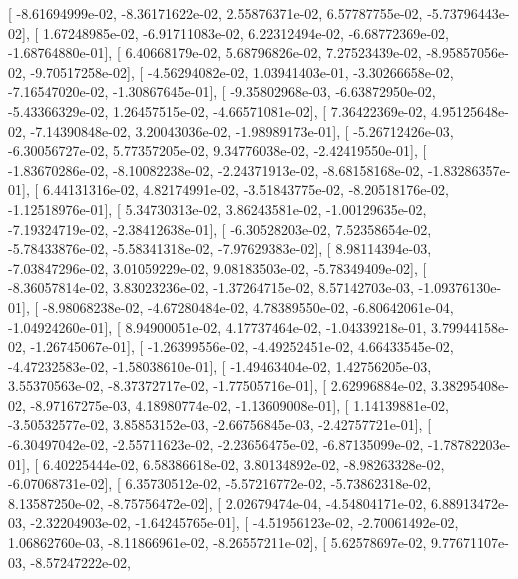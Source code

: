 \documentclass{article}
\begin{document}
       [ -8.61694999e-02,  -8.36171622e-02,   2.55876371e-02,
          6.57787755e-02,  -5.73796443e-02],
       [  1.67248985e-02,  -6.91711083e-02,   6.22312494e-02,
         -6.68772369e-02,  -1.68764880e-01],
       [  6.40668179e-02,   5.68796826e-02,   7.27523439e-02,
         -8.95857056e-02,  -9.70517258e-02],
       [ -4.56294082e-02,   1.03941403e-01,  -3.30266658e-02,
         -7.16547020e-02,  -1.30867645e-01],
       [ -9.35802968e-03,  -6.63872950e-02,  -5.43366329e-02,
          1.26457515e-02,  -4.66571081e-02],
       [  7.36422369e-02,   4.95125648e-02,  -7.14390848e-02,
          3.20043036e-02,  -1.98989173e-01],
       [ -5.26712426e-03,  -6.30056727e-02,   5.77357205e-02,
          9.34776038e-02,  -2.42419550e-01],
       [ -1.83670286e-02,  -8.10082238e-02,  -2.24371913e-02,
         -8.68158168e-02,  -1.83286357e-01],
       [  6.44131316e-02,   4.82174991e-02,  -3.51843775e-02,
         -8.20518176e-02,  -1.12518976e-01],
       [  5.34730313e-02,   3.86243581e-02,  -1.00129635e-02,
         -7.19324719e-02,  -2.38412638e-01],
       [ -6.30528203e-02,   7.52358654e-02,  -5.78433876e-02,
         -5.58341318e-02,  -7.97629383e-02],
       [  8.98114394e-03,  -7.03847296e-02,   3.01059229e-02,
          9.08183503e-02,  -5.78349409e-02],
       [ -8.36057814e-02,   3.83023236e-02,  -1.37264715e-02,
          8.57142703e-03,  -1.09376130e-01],
       [ -8.98068238e-02,  -4.67280484e-02,   4.78389550e-02,
         -6.80642061e-04,  -1.04924260e-01],
       [  8.94900051e-02,   4.17737464e-02,  -1.04339218e-01,
          3.79944158e-02,  -1.26745067e-01],
       [ -1.26399556e-02,  -4.49252451e-02,   4.66433545e-02,
         -4.47232583e-02,  -1.58038610e-01],
       [ -1.49463404e-02,   1.42756205e-03,   3.55370563e-02,
         -8.37372717e-02,  -1.77505716e-01],
       [  2.62996884e-02,   3.38295408e-02,  -8.97167275e-03,
          4.18980774e-02,  -1.13609008e-01],
       [  1.14139881e-02,  -3.50532577e-02,   3.85853152e-03,
         -2.66756845e-03,  -2.42757721e-01],
       [ -6.30497042e-02,  -2.55711623e-02,  -2.23656475e-02,
         -6.87135099e-02,  -1.78782203e-01],
       [  6.40225444e-02,   6.58386618e-02,   3.80134892e-02,
         -8.98263328e-02,  -6.07068731e-02],
       [  6.35730512e-02,  -5.57216772e-02,  -5.73862318e-02,
          8.13587250e-02,  -8.75756472e-02],
       [  2.02679474e-04,  -4.54804171e-02,   6.88913472e-03,
         -2.32204903e-02,  -1.64245765e-01],
       [ -4.51956123e-02,  -2.70061492e-02,   1.06862760e-03,
         -8.11866961e-02,  -8.26557211e-02],
       [  5.62578697e-02,   9.77671107e-03,  -8.57247222e-02,
\end{document}
